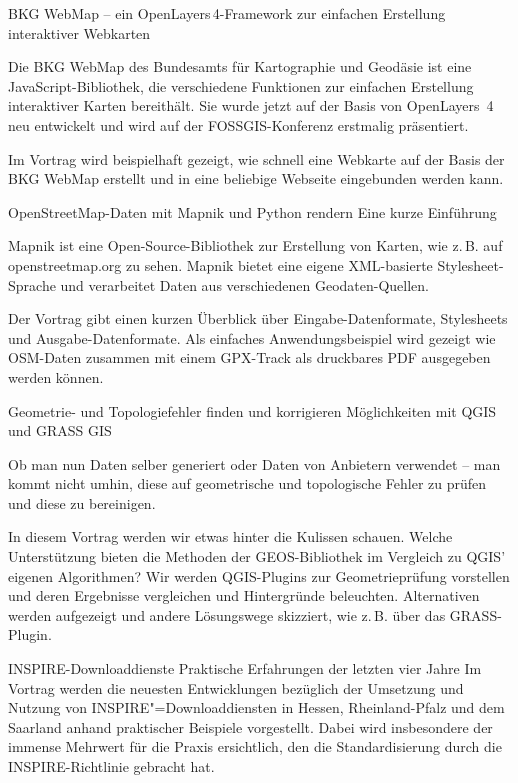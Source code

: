 %
{BKG WebMap -- ein OpenLayers\,4-Framework zur einfachen Erstellung interaktiver Webkarten}%
{}%
{%
Die BKG WebMap des Bundesamts für Kartographie und Geodäsie ist eine JavaScript-Bibliothek, die
verschiedene Funktionen zur einfachen Erstellung interaktiver Karten bereithält. Sie wurde jetzt auf
der Basis von OpenLayers~4 neu entwickelt und wird auf der FOSSGIS-Konferenz erstmalig präsentiert.

Im Vortrag wird beispielhaft gezeigt, wie schnell eine Webkarte auf der Basis
der BKG WebMap erstellt und in eine beliebige Webseite eingebunden werden kann.
}

%
{OpenStreetMap-Daten mit Mapnik und Python rendern\vspace{0.2em}}%
{Eine kurze Einführung}%
{%
Mapnik ist eine Open-Source-Bibliothek zur Erstellung von Karten, wie z.\,B. auf openstreetmap.org
zu sehen. Mapnik bietet eine eigene XML-basierte Stylesheet-Sprache und verarbeitet Daten aus
verschiedenen Geodaten-Quellen.

Der Vortrag gibt einen kurzen Überblick über Eingabe-Datenformate, Stylesheets und
Ausgabe-Datenformate. Als einfaches Anwendungsbeispiel wird gezeigt wie OSM-Daten zusammen
mit einem GPX-Track als druckbares PDF ausgegeben werden können.
}

%
{Geometrie- und Topologiefehler finden und korrigieren}%
{Möglichkeiten mit QGIS und GRASS GIS}%
{%
Ob man nun Daten selber generiert oder Daten von Anbietern verwendet -- man kommt nicht umhin, diese
auf geometrische und topologische Fehler zu prüfen und diese zu bereinigen.

In diesem Vortrag werden wir etwas hinter die Kulissen schauen. Welche Unterstützung bieten die
Methoden der GEOS-Bibliothek im Vergleich zu QGIS' eigenen Algorithmen? Wir werden QGIS-Plugins zur
Geometrieprüfung vorstellen und deren Ergebnisse vergleichen und Hintergründe beleuchten.
Alternativen werden aufgezeigt und andere Lösungswege skizziert, wie z.\,B. über das GRASS-Plugin.%
}

%
{INSPIRE-Downloaddienste}%
{Praktische Erfahrungen der letzten vier Jahre}%
{%
Im Vortrag werden die neuesten Entwicklungen bezüglich der Umsetzung und Nutzung von
INSPIRE"=Downloaddiensten in Hessen, Rheinland-Pfalz und dem Saarland anhand praktischer
Beispiele vorgestellt. Dabei wird insbesondere der immense Mehrwert für die Praxis ersichtlich, den
die Standardisierung durch die INSPIRE-Richtlinie gebracht hat.%
}

